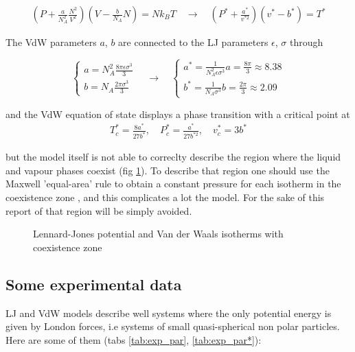 \documentclass[a4paper, 11pt]{article}
\begin{document}
    \begin{gather} \label{eq:vdw}
      \left(P + \frac{a}{N_A^2}\frac{N^2}{V^2} \right)\left(V - \frac{b}{N_A}N \right) = Nk_BT \quad \rightarrow \quad
      \left(P^* + \frac{a^*}{v^{*2}} \right)(v^* - b^*) = T^*
    \end{gather}

    The VdW parameters $a$, $b$ are connected to the LJ parameters $\epsilon$, $\sigma$ through

    \begin{equation} \label{eq:ab}
      \begin{cases}
        a = N_A^2\frac{8\pi\epsilon\sigma^3}{3}\\
        b = N_A\frac{2\pi\sigma^3}{3}
      \end{cases}
      \quad \rightarrow \quad
      \begin{cases}
        a^* = \frac{1}{N_A^2\epsilon\sigma^3}a = \frac{8\pi}{3} \approx 8.38\\
        b^* = \frac{1}{N_A\sigma^3}b = \frac{2\pi}{3} \approx 2.09
      \end{cases}
    \end{equation}

    and the  VdW equation of state displays a phase transition with a critical point at
    \begin{gather*}
      T_c^* = \frac{8a^*}{27b^*}, \quad P_c^* = \frac{a^*}{27b^{*2}}, \quad v_c^* = 3b^*
    \end{gather*}

    but the model itself is not able to correclty describe the region where the liquid and vapour phases coexist (fig \ref{fig:models}). To describe that region one should use the Maxwell 'equal-area' rule to obtain a constant pressure for each isotherm in the coexistence zone \cite{rif:Maxwell}, and this complicates a lot the model. For the sake of this report of that region will be simply avoided.

    \begin{figure}[H]
      \centering
       \hspace{-0.5cm}
      \caption{Lennard-Jones potential and Van der Waals isotherms with coexistence zone}
      \label{fig:models}
    \end{figure}

  \subsection{Some experimental data}
    LJ and VdW models describe well systems where the only potential energy is given by London forces, i.e systems of small quasi-spherical non polar particles. Here are some of them (tabs \ref{tab:exp_par}, \ref{tab:exp_par*}):
\end{document}
